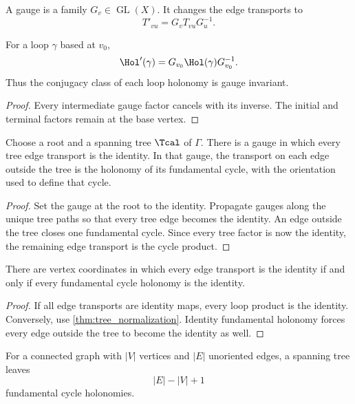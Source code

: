 \begin{definition}\label{def:gauge_change}
A gauge is a family $G_v\in\operatorname{GL}(X)$.  It changes the edge transports to
\[
T'_{vu}=G_vT_{vu}G_u^{-1}.
\]
\end{definition}

\begin{proposition}\label{prop:gauge_covariance}
For a loop $\gamma$ based at $v_0$,
\[
\Hol'(\gamma)
=
G_{v_0}\Hol(\gamma)G_{v_0}^{-1}.
\]
Thus the conjugacy class of each loop holonomy is gauge invariant.
\end{proposition}

\begin{proof}
Every intermediate gauge factor cancels with its inverse.  The initial and terminal factors remain at the base vertex.
\end{proof}

\begin{theorem}\label{thm:tree_normalization}
Choose a root and a spanning tree $\Tcal$ of $\Gamma$.  There is a gauge in which every tree edge transport is the identity.  In that gauge, the transport on each edge outside the tree is the holonomy of its fundamental cycle, with the orientation used to define that cycle.
\end{theorem}

\begin{proof}
Set the gauge at the root to the identity.  Propagate gauges along the unique tree paths so that every tree edge becomes the identity.  An edge outside the tree closes one fundamental cycle.  Since every tree factor is now the identity, the remaining edge transport is the cycle product.
\end{proof}

\begin{theorem}\label{thm:cycle_gluing}
There are vertex coordinates in which every edge transport is the identity if and only if every fundamental cycle holonomy is the identity.
\end{theorem}

\begin{proof}
If all edge transports are identity maps, every loop product is the identity.  Conversely, use \cref{thm:tree_normalization}.  Identity fundamental holonomy forces every edge outside the tree to become the identity as well.
\end{proof}

\begin{corollary}\label{cor:cycle_number}
For a connected graph with $|V|$ vertices and $|E|$ unoriented edges, a spanning tree leaves
\[
|E|-|V|+1
\]
fundamental cycle holonomies.
\end{corollary}

